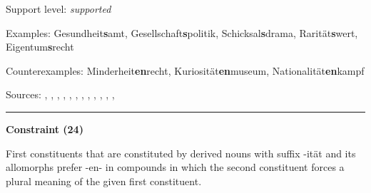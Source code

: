 \vspace{-1.35em}

\noindent
Support level: \textit{supported}

\vspace{0.3em}

\noindent
Examples: Gesundheit\textbf{s}amt, Gesellschaft\textbf{s}politik, Schicksal\textbf{s}drama, Rarität\textbf{s}wert, Eigentum\textbf{s}recht

\noindent
Counterexamples: Minderheit\textbf{en}recht, Kuriosität\textbf{en}museum, Nationalität\textbf{en}kampf

\vspace{0.3em}

\noindent
Sources: \citet[230]{eisenberg_2013}, \citet[572]{fuhrhop_kuerschner_2015}, \citet[61]{koliopoulou_2014}, \citet[3]{krott_etal_2007}, \citet[107, 115]{kuerschner_2005}, \citet[20, 21]{kuerschner_2010}, \citet[10, 20, 23]{nuebling_szczepaniak_2008}, \citet[77]{nuebling_szczepaniak_2013}, \citet[73, 83, 88, 89, 94]{ortner_mueller-bollhagen_1991}, \citet[229]{schaefer_2018}, \citet[8]{schaefer_pankratz_2018}, \citet[19]{schluecker_2023}, \citet[448]{wegener_2003}

\vspace{0.35em}
\hrule




\vspace{0.4em}

\begin{center}
\textbf{Constraint (24)}
\end{center}

\noindent
First constituents that are constituted by derived nouns with suffix -ität and its allomorphs prefer -en- in compounds in which the second constituent forces a plural meaning of the given first constituent.
\vspace{0.5em}


\vspace{-0.25em}

